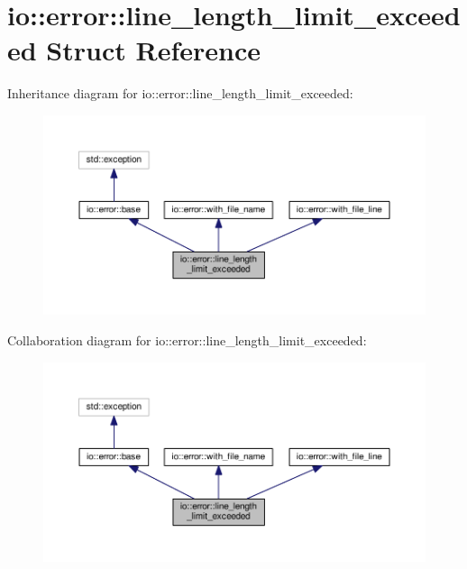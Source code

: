 \section{io\+:\+:error\+:\+:line\+\_\+length\+\_\+limit\+\_\+exceeded Struct Reference}
\label{structio_1_1error_1_1line__length__limit__exceeded}


Inheritance diagram for io\+:\+:error\+:\+:line\+\_\+length\+\_\+limit\+\_\+exceeded\+:\nopagebreak
\begin{figure}[H]
\begin{center}
\leavevmode
\includegraphics[width=350pt]{structio_1_1error_1_1line__length__limit__exceeded__inherit__graph}
\end{center}
\end{figure}


Collaboration diagram for io\+:\+:error\+:\+:line\+\_\+length\+\_\+limit\+\_\+exceeded\+:\nopagebreak
\begin{figure}[H]
\begin{center}
\leavevmode
\includegraphics[width=350pt]{structio_1_1error_1_1line__length__limit__exceeded__coll__graph}
\end{center}
\end{figure}

